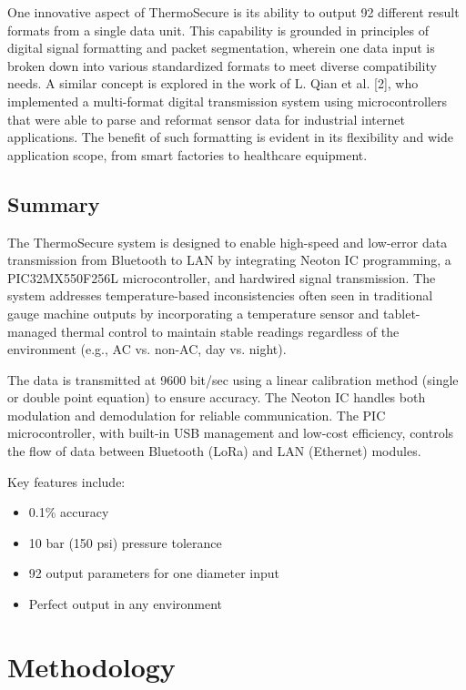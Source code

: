 \documentclass[12pt]{report}
\begin{document}
One innovative aspect of ThermoSecure is its ability to output 92 different result formats from a single data unit. This capability is grounded in principles of digital signal formatting and packet segmentation, wherein one data input is broken down into various standardized formats to meet diverse compatibility needs. A similar concept is explored in the work of L. Qian et al. [2], who implemented a multi-format digital transmission system using microcontrollers that were able to parse and reformat sensor data for industrial internet applications. The benefit of such formatting is evident in its flexibility and wide application scope, from smart factories to healthcare equipment.


\section{Summary}
The ThermoSecure system is designed to enable high-speed and low-error data transmission from Bluetooth to LAN by integrating Neoton IC programming, a PIC32MX550F256L microcontroller, and hardwired signal transmission. The system addresses temperature-based inconsistencies often seen in traditional gauge machine outputs by incorporating a temperature sensor and tablet-managed thermal control to maintain stable readings regardless of the environment (e.g., AC vs. non-AC, day vs. night).

The data is transmitted at 9600 bit/sec using a linear calibration method (single or double point equation) to ensure accuracy. The Neoton IC handles both modulation and demodulation for reliable communication. The PIC microcontroller, with built-in USB management and low-cost efficiency, controls the flow of data between Bluetooth (LoRa) and LAN (Ethernet) modules.

Key features include:
\begin{itemize}
    \item 0.1\% accuracy
    \item 10 bar (150 psi) pressure tolerance
    \item 92 output parameters for one diameter input
    \item Perfect output in any environment
\end{itemize}

\chapter{Methodology}
\end{document}
